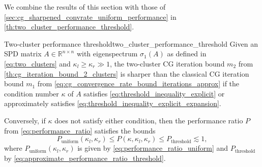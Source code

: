 We combine the results of this section with those of \cref{sec:cg_sharpened_convrate_uniform_performance} in \cref{th:two_cluster_performance_threshold}.
\begin{fancyth}{Two-cluster performance threshold}{two_cluster_performance_threshold}
    Given an SPD matrix $A \in \mathbb{R}^{n \times n}$ with eigenspectrum $\sigma_1(A)$ as defined in \cref{eq:two_clusters} and $\kappa_l \geq \kappa_r \gg 1$, the two-cluster CG iteration bound $m_2$ from \cref{th:cg_iteration_bound_2_clusters} is sharper than the classical CG iteration bound $m_1$ from \cref{eq:cg_convergence_rate_bound_iterations_approx} if the condition number $\kappa$ of $A$ satisfies \cref{eq:threshold_inequality_explicit} or approximately satisfies \cref{eq:threshold_inequality_explicit_expansion}.

    Conversely, if $\kappa$ does not satisfy either condition, then the performance ratio $P$ from \cref{eq:performance_ratio} satisfies the bounds
    \begin{equation}
        P_{\text{uniform}}(\kappa_l, \kappa_r) \leq P(\kappa, \kappa_l, \kappa_r) \leq P_{\text{threshold}} \lesssim 1,
        \label{eq:performance_bounds}
    \end{equation} 
    where $P_{\text{uniform}}(\kappa_l, \kappa_r)$ is given by \cref{eq:performance_ratio_uniform} and $P_{\text{threshold}}$ by \cref{eq:approximate_performance_ratio_threshold}.
\end{fancyth}

